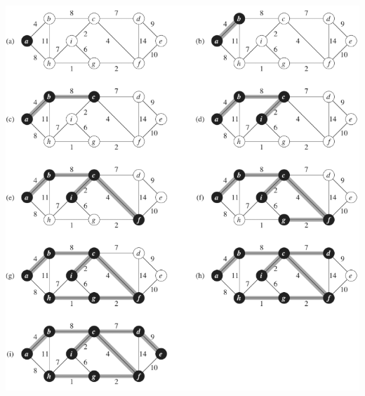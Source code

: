 \documentclass[a4paper]{article}
\begin{document}
\includegraphics[width=\textwidth]{Prim}
\end{document}
